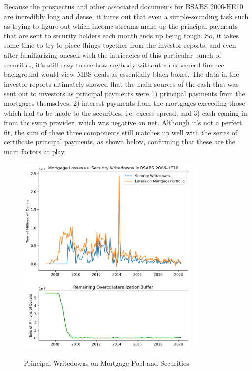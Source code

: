 \documentclass[12pt]{article}
\begin{document}
	Because the prospectus and other associated documents for BSABS 2006-HE10 are incredibly long and dense, it turns out that even a simple-sounding task such as trying to figure out which income streams make up the principal payments that are sent to security holders each month ends up being tough. So, it takes some time to try to piece things together from the investor reports, and even after familiarizing oneself with the intricacies of this particular bunch of securities, it’s still easy to see how anybody without an advanced finance background would view MBS deals as essentially black boxes. The data in the investor reports ultimately showed that the main sources of the cash that was sent out to investors as principal payments were 1) principal payments from the mortgages themselves, 2) interest payments from the mortgages exceeding those which had to be made to the securities, i.e. excess spread, and 3) cash coming in from the swap provider, which was negative on net. Although it’s not a perfect fit, the sum of these three components still matches up well with the series of certificate principal payments, as shown below, confirming that these are the main factors at play.


\begin{figure}[h]
	\centering
	\caption{Principal Writedowns on Mortgage Pool and Securities}
	\includegraphics[width=0.8\textwidth]{../figures/timeseries_losses_vs_writedowns}
	\label{fig:timeseries_losses_vs_writedowns}
\end{figure}
\end{document}
